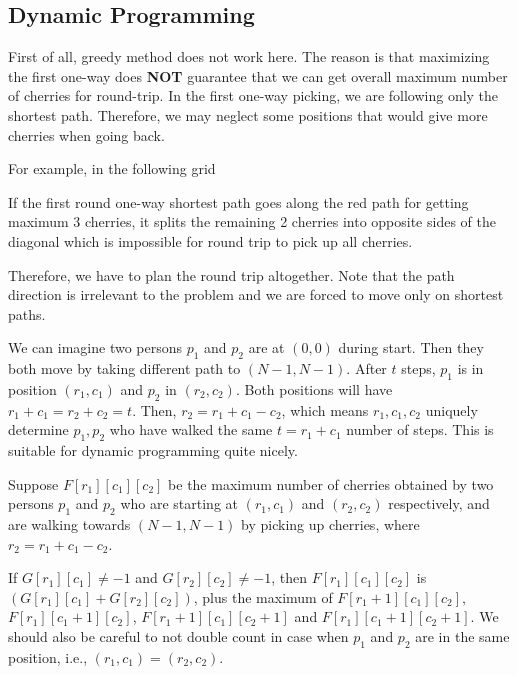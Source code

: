 \subsection{Dynamic Programming}
First of all, greedy method does not work here. The reason is that maximizing the first one-way does \textbf{NOT} guarantee that we can get overall maximum number of cherries for round-trip. In the first one-way picking, we are following only the shortest path. Therefore, we may neglect some positions that would give more cherries when going back.
\par
For example, in the following grid
\begin{figure}[H]
\centering
{}
\end{figure}
If the first round one-way shortest path goes along the red path for getting maximum 3 cherries, it splits the remaining 2 cherries into opposite sides of the diagonal which is impossible for round trip to pick up all cherries. 
\par
Therefore, we have to plan the round trip altogether. Note that the path direction is irrelevant to the problem and we are forced to move only on shortest paths.
\par
We can imagine two persons $p_1$ and $p_2$ are at $(0,0)$ during start. Then they both move by taking different path to $(N-1, N-1)$. After $t$ steps, $p_1$ is in position $(r_1,c_1)$ and $p_2$ in $(r_2, c_2)$. Both positions will have $r_1+c_1=r_2+c_2=t$. Then, $r_2 = r_1 + c_1 - c_2$, which means $r_1,c_1,c_2$ uniquely determine $p_1, p_2$ who have walked the same $t = r_1+c_1$ number of steps. This is suitable for dynamic programming quite nicely.
\par
Suppose $F[r_1][c_1][c_2]$ be the maximum number of cherries obtained by two persons $p_1$ and $p_2$ who are starting at $(r_1, c_1)$ and $(r_2, c_2)$ respectively, and are walking towards $(N-1, N-1)$ by picking up cherries, where $r_2 = r_1+c_1-c_2$.
\par
If $G[r_1][c_1] \neq -1$ and $G[r_2][c_2] \neq -1$, then $F[r_1][c_1][c_2]$ is $(G[r_1][c_1] + G[r_2][c_2])$, plus the maximum of $F[r_1+1][c_1][c_2]$, $F[r_1][c_1+1][c_2]$, $F[r_1+1][c_1][c_2+1]$ and $F[r_1][c_1+1][c_2+1]$. We should also be careful to not double count in case when $p_1$ and $p_2$ are in the same position, i.e., $(r_1, c_1) = (r_2, c_2)$.
